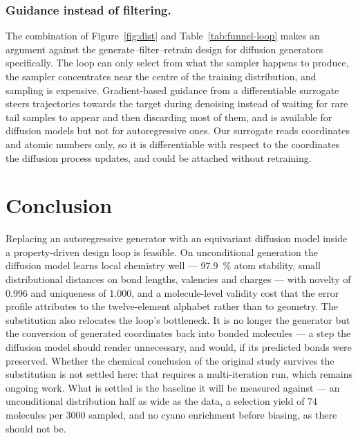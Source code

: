 \documentclass[runningheads]{llncs}
\begin{document}
\subsubsection{Guidance instead of filtering.}
The combination of Figure~\ref{fig:dist} and
Table~\ref{tab:funnel-loop} makes an argument against the
generate--filter--retrain design for diffusion generators specifically.
The loop can only select from what the sampler happens to produce, the
sampler concentrates near the centre of the training distribution, and
sampling is expensive. Gradient-based guidance from a differentiable
surrogate steers trajectories towards the target during denoising
instead of waiting for rare tail samples to appear and then discarding
most of them, and is available for diffusion models but not for
autoregressive ones. Our surrogate reads coordinates and atomic numbers
only, so it is differentiable with respect to the coordinates the
diffusion process updates, and could be attached without
retraining.

\section{Conclusion}

Replacing an autoregressive generator with an equivariant diffusion
model inside a property-driven design loop is feasible. On
unconditional generation the diffusion model learns local chemistry
well --- \SI{97.9}{\percent} atom stability, small distributional
distances on bond lengths, valencies and charges --- with novelty of
\num{0.996} and uniqueness of \num{1.000}, and a molecule-level validity cost that the
error profile attributes to the twelve-element alphabet rather than to
geometry. The substitution also relocates the loop's
bottleneck. It is no longer the generator but the conversion of
generated coordinates back into bonded molecules --- a step the
diffusion model should render unnecessary, and would, if its predicted
bonds were preserved. Whether the chemical conclusion of the original
study survives the substitution is not settled here: that requires a
multi-iteration run, which remains ongoing work. What is settled is the
baseline it will be measured against --- an unconditional distribution
half as wide as the data, a selection yield of \num{74} molecules per
\num{3000} sampled, and no cyano enrichment before biasing, as there
should not be.
\end{document}
